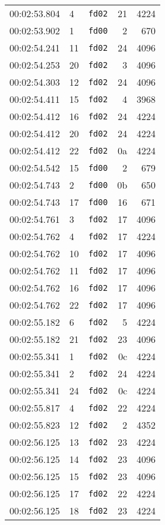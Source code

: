 \documentclass{article}
\begin{document}
\begin{longtable}{lllrr}
00:02:53.804 & 4 & \texttt{fd02} & 21 & 4224 \\
00:02:53.902 & 1 & \texttt{fd00} & 2 & 670 \\
00:02:54.241 & 11 & \texttt{fd02} & 24 & 4096 \\
00:02:54.253 & 20 & \texttt{fd02} & 3 & 4096 \\
00:02:54.303 & 12 & \texttt{fd02} & 24 & 4096 \\
00:02:54.411 & 15 & \texttt{fd02} & 4 & 3968 \\
00:02:54.412 & 16 & \texttt{fd02} & 24 & 4224 \\
00:02:54.412 & 20 & \texttt{fd02} & 24 & 4224 \\
00:02:54.412 & 22 & \texttt{fd02} & 0a & 4224 \\
00:02:54.542 & 15 & \texttt{fd00} & 2 & 679 \\
00:02:54.743 & 2 & \texttt{fd00} & 0b & 650 \\
00:02:54.743 & 17 & \texttt{fd00} & 16 & 671 \\
00:02:54.761 & 3 & \texttt{fd02} & 17 & 4096 \\
00:02:54.762 & 4 & \texttt{fd02} & 17 & 4224 \\
00:02:54.762 & 10 & \texttt{fd02} & 17 & 4096 \\
00:02:54.762 & 11 & \texttt{fd02} & 17 & 4096 \\
00:02:54.762 & 16 & \texttt{fd02} & 17 & 4096 \\
00:02:54.762 & 22 & \texttt{fd02} & 17 & 4096 \\
00:02:55.182 & 6 & \texttt{fd02} & 5 & 4224 \\
00:02:55.182 & 21 & \texttt{fd02} & 23 & 4096 \\
00:02:55.341 & 1 & \texttt{fd02} & 0c & 4224 \\
00:02:55.341 & 2 & \texttt{fd02} & 24 & 4224 \\
00:02:55.341 & 24 & \texttt{fd02} & 0c & 4224 \\
00:02:55.817 & 4 & \texttt{fd02} & 22 & 4224 \\
00:02:55.823 & 12 & \texttt{fd02} & 2 & 4352 \\
00:02:56.125 & 13 & \texttt{fd02} & 23 & 4224 \\
00:02:56.125 & 14 & \texttt{fd02} & 23 & 4096 \\
00:02:56.125 & 15 & \texttt{fd02} & 23 & 4096 \\
00:02:56.125 & 17 & \texttt{fd02} & 22 & 4224 \\
00:02:56.125 & 18 & \texttt{fd02} & 23 & 4224 \\

\end{longtable}
\end{document}
